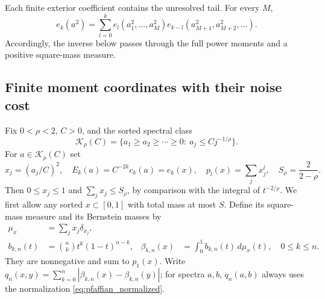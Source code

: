 \documentclass[11pt,a4paper]{amsart}
\numberwithin{equation}{section}
\theoremstyle{definition}
\theoremstyle{remark}
\begin{document}
Each finite exterior coefficient contains the unresolved tail. For every $M$,
\[
 e_k(a^2)=\sum_{l=0}^k e_l(a_1^2,\ldots,a_M^2)
                       e_{k-l}(a_{M+1}^2,a_{M+2}^2,\ldots).
\]
Accordingly, the inverse below passes through the full power moments and a positive square-mass measure.

\subsection{Finite moment coordinates with their noise cost}
Fix $0<\rho<2$, $C>0$, and the sorted spectral class
\begin{equation}\label{eq:pfaffian_class}
 \mathcal K_\rho(C)=\{a_1\ge a_2\ge\cdots\ge0:\ a_j\le Cj^{-1/\rho}\}.
\end{equation}
For $a\in\mathcal K_\rho(C)$ set
\begin{equation}\label{eq:pfaffian_normalized}
 x_j=(a_j/C)^2,\quad E_k(a)=C^{-2k}c_k(a)=e_k(x),\quad
 p_l(x)=\sum_jx_j^l,\quad S_\rho=\frac2{2-\rho}.
\end{equation}
Then $0\le x_j\le1$ and $\sum_jx_j\le S_\rho$, by comparison with the integral of $t^{-2/\rho}$. We first allow any sorted $x\subset[0,1]$ with total mass at most $S$.
Define its square-mass measure and its Bernstein masses by
\begin{align}
 \mu_x&=\sum_jx_j\delta_{x_j},\label{eq:pfaffian_mass_measure}\\
 b_{k,n}(t)&=\binom nk t^k(1-t)^{n-k},&
 \beta_{k,n}(x)&=\int_0^1b_{k,n}(t)\,d\mu_x(t),\quad 0\le k\le n.
 \label{eq:pfaffian_bernstein_masses}
\end{align}
They are nonnegative and sum to $p_1(x)$. Write
$q_n(x,y)=\sum_{k=0}^n|\beta_{k,n}(x)-\beta_{k,n}(y)|$;
for spectra $a,b$, $q_n(a,b)$ always uses the normalization \eqref{eq:pfaffian_normalized}.
\end{document}
